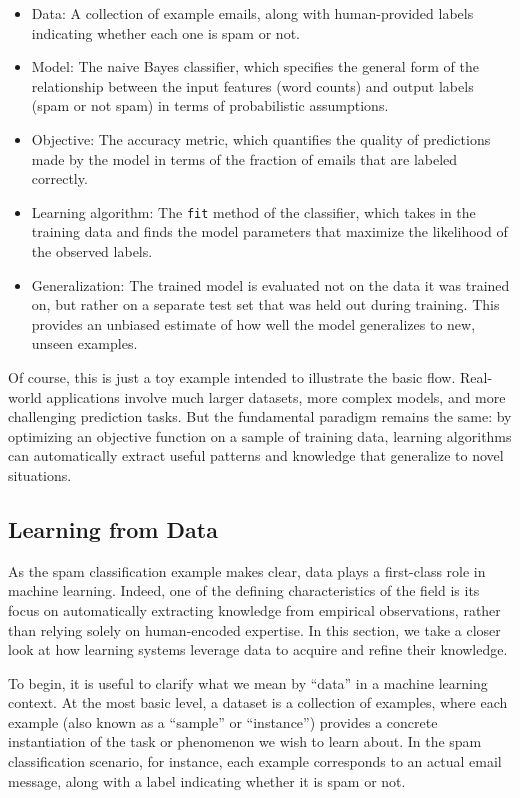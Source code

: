 \documentclass[
  9pt,
  letterpaper,
  abstract,
  titlepage]{scrbook}
\begin{document}
\begin{itemize}
\item
  Data: A collection of example emails, along with human-provided labels
  indicating whether each one is spam or not.
\item
  Model: The naive Bayes classifier, which specifies the general form of
  the relationship between the input features (word counts) and output
  labels (spam or not spam) in terms of probabilistic assumptions.
\item
  Objective: The accuracy metric, which quantifies the quality of
  predictions made by the model in terms of the fraction of emails that
  are labeled correctly.
\item
  Learning algorithm: The \texttt{fit} method of the classifier, which
  takes in the training data and finds the model parameters that
  maximize the likelihood of the observed labels.
\item
  Generalization: The trained model is evaluated not on the data it was
  trained on, but rather on a separate test set that was held out during
  training. This provides an unbiased estimate of how well the model
  generalizes to new, unseen examples.
\end{itemize}

Of course, this is just a toy example intended to illustrate the basic
flow. Real-world applications involve much larger datasets, more complex
models, and more challenging prediction tasks. But the fundamental
paradigm remains the same: by optimizing an objective function on a
sample of training data, learning algorithms can automatically extract
useful patterns and knowledge that generalize to novel situations.

\subsection{Learning from Data}\label{learning-from-data}

As the spam classification example makes clear, data plays a first-class
role in machine learning. Indeed, one of the defining characteristics of
the field is its focus on automatically extracting knowledge from
empirical observations, rather than relying solely on human-encoded
expertise. In this section, we take a closer look at how learning
systems leverage data to acquire and refine their knowledge.

To begin, it is useful to clarify what we mean by ``data'' in a machine
learning context. At the most basic level, a dataset is a collection of
examples, where each example (also known as a ``sample'' or
``instance'') provides a concrete instantiation of the task or
phenomenon we wish to learn about. In the spam classification scenario,
for instance, each example corresponds to an actual email message, along
with a label indicating whether it is spam or not.
\end{document}
